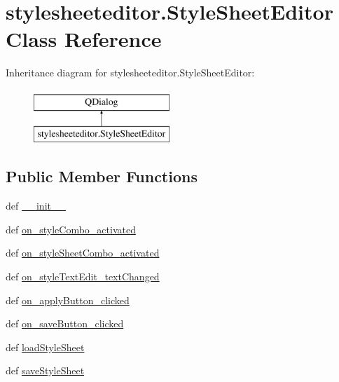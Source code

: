 \hypertarget{classstylesheeteditor_1_1StyleSheetEditor}{}\section{stylesheeteditor.\+Style\+Sheet\+Editor Class Reference}
\label{classstylesheeteditor_1_1StyleSheetEditor}
Inheritance diagram for stylesheeteditor.\+Style\+Sheet\+Editor\+:\begin{figure}[H]
\begin{center}
\leavevmode
\includegraphics[height=2.000000cm]{classstylesheeteditor_1_1StyleSheetEditor}
\end{center}
\end{figure}
\subsection*{Public Member Functions}
\begin{DoxyCompactItemize}
\item 
def \hyperlink{classstylesheeteditor_1_1StyleSheetEditor_a256b817186a28a861321ddf6f0023fef}{\+\_\+\+\_\+init\+\_\+\+\_\+}
\item 
def \hyperlink{classstylesheeteditor_1_1StyleSheetEditor_a839090dc6d4026491375c905d57da075}{on\+\_\+style\+Combo\+\_\+activated}
\item 
def \hyperlink{classstylesheeteditor_1_1StyleSheetEditor_a2ec178356c2b81599c400a0dacefda90}{on\+\_\+style\+Sheet\+Combo\+\_\+activated}
\item 
def \hyperlink{classstylesheeteditor_1_1StyleSheetEditor_a2e9cfb2b874fd211296ccadd4218d1e4}{on\+\_\+style\+Text\+Edit\+\_\+text\+Changed}
\item 
def \hyperlink{classstylesheeteditor_1_1StyleSheetEditor_af8afc83c69a815147745a754eb029038}{on\+\_\+apply\+Button\+\_\+clicked}
\item 
def \hyperlink{classstylesheeteditor_1_1StyleSheetEditor_a520c95f676c50d7cca9130d31c3f1750}{on\+\_\+save\+Button\+\_\+clicked}
\item 
def \hyperlink{classstylesheeteditor_1_1StyleSheetEditor_a2778f390b4d1d838ad4b6180b9d0e8ae}{load\+Style\+Sheet}
\item 
def \hyperlink{classstylesheeteditor_1_1StyleSheetEditor_aecac579e0efd0296463e3ee9bfeefcf3}{save\+Style\+Sheet}
\end{DoxyCompactItemize}
